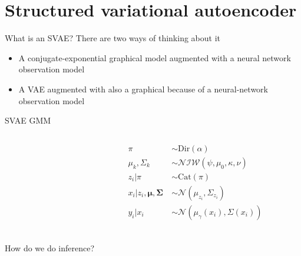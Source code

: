 \documentclass[10pt, compress]{beamer}
\begin{document}
\section{Structured variational autoencoder}

\begin{frame}{What is an SVAE?}
  There are two ways of thinking about it
  \begin{itemize}
    \item A conjugate-exponential graphical model
      augmented with a neural network observation model
    \item A VAE augmented with 
      also a graphical
      because of a neural-network observation model
  \end{itemize}

  \pause

  \centering
  
\end{frame}

\begin{frame}{SVAE GMM}
  \begin{columns}
    \begin{column}{0.5\textwidth}
      
    \end{column}
    \begin{column}{0.5\textwidth}
      \begin{align*}
        \pi &\sim \textrm{Dir}(\alpha) \\
        \mu_k, \Sigma_k &\sim \mathcal{NIW}(\psi, \mu_0, \kappa, \nu) \\
        z_i | \pi &\sim \textrm{Cat}(\pi) \\
        x_i | z_i, \bm{\mu}, \bm{\Sigma} \ &\sim \mathcal{N}(\mu_{z_i}, \Sigma_{z_i}) \\
        y_i | x_i &\sim \mathcal{N}(\mu_\gamma(x_i), \Sigma(x_i)) \\
      \end{align*}
    \end{column}
  \end{columns}
  \pause
  How do we do inference?
\end{frame}
\end{document}

